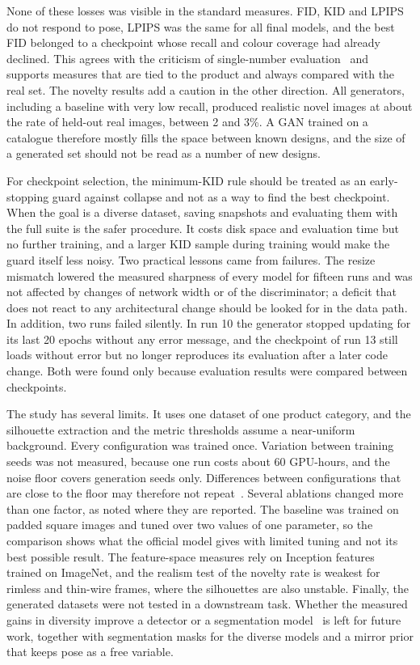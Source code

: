 \documentclass[electronics,article,submit,pdftex,moreauthors]{Definitions/mdpi}
\begin{document}
None of these losses was visible in the standard measures. FID, KID and LPIPS
do not respond to pose, LPIPS was the same for all final models, and the best
FID belonged to a checkpoint whose recall and colour coverage had already
declined. This agrees with the criticism of single-number
evaluation~\cite{jayasumana2024rethinkingfid,stein2023exposingflaws} and
supports measures that are tied to the product and always compared with the
real set. The novelty results add a caution in the other direction. All
generators, including a baseline with very low recall, produced realistic
novel images at about the rate of held-out real images, between 2 and 3\%. A
GAN trained on a catalogue therefore mostly fills the space between known
designs, and the size of a generated set should not be read as a number of
new designs.

For checkpoint selection, the minimum-KID rule should be treated as an
early-stopping guard against collapse and not as a way to find the best
checkpoint. When the goal is a diverse dataset, saving snapshots and
evaluating them with the full suite is the safer procedure. It costs disk
space and evaluation time but no further training, and a larger KID sample
during training would make the guard itself less noisy. Two practical lessons
came from failures. The resize mismatch lowered the measured sharpness of
every model for fifteen runs and was not affected by changes of network width
or of the discriminator; a deficit that does not react to any architectural
change should be looked for in the data path. In addition, two runs failed
silently. In run 10 the generator stopped updating for its last 20 epochs
without any error message, and the checkpoint of run 13 still loads without
error but no longer reproduces its evaluation after a later code change. Both
were found only because evaluation results were compared between checkpoints.

The study has several limits. It uses one dataset of one product category,
and the silhouette extraction and the metric thresholds assume a near-uniform
background. Every configuration was trained once. Variation between training
seeds was not measured, because one run costs about 60 GPU-hours, and the
noise floor covers generation seeds only. Differences between configurations
that are close to the floor may therefore not repeat~\cite{lucic2018equal}.
Several ablations changed more than one factor, as noted where they are
reported. The baseline was trained on padded square images and tuned over two
values of one parameter, so the comparison shows what the official model
gives with limited tuning and not its best possible result. The feature-space
measures rely on Inception features trained on ImageNet, and the realism test
of the novelty rate is weakest for rimless and thin-wire frames, where the
silhouettes are also unstable. Finally, the generated datasets were not
tested in a downstream task. Whether the measured gains in diversity improve
a detector or a segmentation model~\cite{ravuri2019cas} is left for future
work, together with segmentation masks for the diverse models and a mirror
prior that keeps pose as a free variable.
\end{document}
